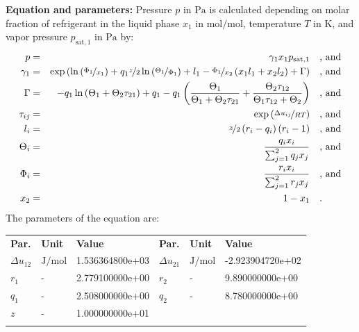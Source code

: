 \textbf{Equation and parameters:}
\newline
%
Pressure $p$ in $\si{\pascal}$ is calculated depending on molar fraction of refrigerant in the liquid phase $x_1$ in $\si{\mole\per\mole}$, temperature $T$ in $\si{\kelvin}$, and vapor pressure $p_\mathrm{sat,1}$ in $\si{\pascal}$ by:
%
\begin{equation*}
\begin{split}
p &=& \gamma_1 x_1 p_\mathrm{sat,1} & \quad\text{, and} \\
\gamma_1 &=& \exp \left( \ln \left( \nicefrac{\Phi_1}{x_1} \right) + q_1 \nicefrac{z}{2} \ln \left( \nicefrac{\Theta_1}{\Phi_1} \right) + l_1 - \nicefrac{\Phi_1}{x_2} \left( x_1 l_1 + x_2 l_2 \right) + \Gamma \right) & \quad\text{, and} \\
\Gamma &=& - q_1 \ln \left( \Theta_1 + \Theta_2 \tau_{21} \right) + q_1 - q_1 \left( \frac{\Theta_1}{\Theta_1 + \Theta_2 \tau_{21}} + \frac{\Theta_2 \tau_{12}}{\Theta_1 \tau_{12} + \Theta_2} \right) & \quad\text{, and} \\
\tau_{ij} &=& \exp \left( \nicefrac{\Delta u_{ij}}{R T} \right) & \quad\text{, and} \\
l_i &=& \nicefrac{z}{2} \left( r_i - q_i \right) \left(r_i - 1 \right) & \quad\text{, and} \\
\Theta_i &=& \frac{q_i x_i}{\sum_{j=1}^{2} q_j x_j} & \quad\text{, and} \\
\Phi_i &=& \frac{r_i x_i}{\sum_{j=1}^{2} r_j x_j} & \quad\text{, and} \\
x_2 &=& 1 - x_1  & \quad\text{.} \\
\end{split}
\end{equation*}
%
The parameters of the equation are:
%
\begin{longtable}[l]{lll|lll}
\toprule
\addlinespace
\textbf{Par.} & \textbf{Unit} & \textbf{Value} &	\textbf{Par.} & \textbf{Unit} & \textbf{Value} \\
\addlinespace
\midrule
\endhead

\bottomrule
\endfoot
\bottomrule
\endlastfoot
\addlinespace

$\Delta u_{12}$ & $\si{\joule\per\mole}$ & 1.536364800e+03 & $\Delta u_{21}$ & $\si{\joule\per\mole}$ & -2.923904720e+02 \\
$r_{1}$ & - & 2.779100000e+00 & $r_{2}$ & - & 9.890000000e+00 \\
$q_{1}$ & - & 2.508000000e+00 & $q_{2}$ & - & 8.780000000e+00 \\
$z$ & - & 1.000000000e+01 & & &  \\

\addlinespace\end{longtable}

